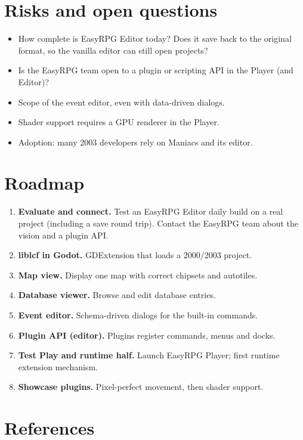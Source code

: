 \documentclass[11pt,a4paper]{article}
\begin{document}
\section{Risks and open questions}

\begin{itemize}
  \item How complete is EasyRPG Editor today? Does it save back to the original format,
        so the vanilla editor can still open projects?
  \item Is the EasyRPG team open to a plugin or scripting API in the Player (and Editor)?
  \item Scope of the event editor, even with data-driven dialogs.
  \item Shader support requires a GPU renderer in the Player.
  \item Adoption: many 2003 developers rely on Maniacs and its editor.
\end{itemize}

\section{Roadmap}

\begin{enumerate}[label=\textbf{M\arabic*}, start=0]
  \item \textbf{Evaluate and connect.} Test an EasyRPG Editor daily build on a real
        project (including a save round trip). Contact the EasyRPG team about the vision
        and a plugin API.
  \item \textbf{liblcf in Godot.} GDExtension that loads a 2000/2003 project.
  \item \textbf{Map view.} Display one map with correct chipsets and autotiles.
  \item \textbf{Database viewer.} Browse and edit database entries.
  \item \textbf{Event editor.} Schema-driven dialogs for the built-in commands.
  \item \textbf{Plugin API (editor).} Plugins register commands, menus and docks.
  \item \textbf{Test Play and runtime half.} Launch EasyRPG Player; first runtime
        extension mechanism.
  \item \textbf{Showcase plugins.} Pixel-perfect movement, then shader support.
\end{enumerate}

\section*{References}
\end{document}

